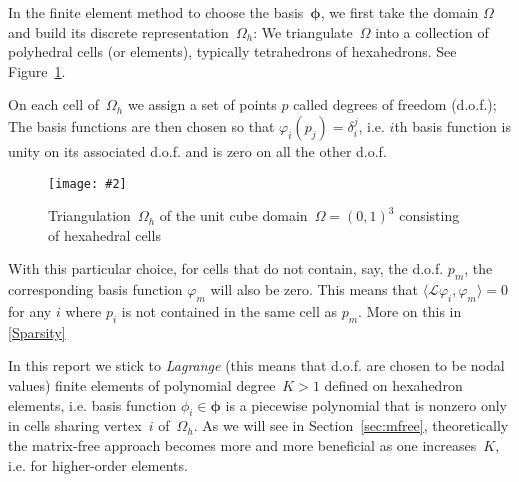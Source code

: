 \documentclass[12pt]{article}
\newcommand{\includegraphicsw}[2][1.]{\texttt{[image: \#2]}}
\newcommand{\vect}[1]{\boldsymbol{\mathbf{#1}}}
\newcommand{\AZ}[1]{{\color{red}\textbf{AZ}:~#1}}
\begin{document}
In the finite element method to choose the basis~$\vect\phi$, we first take the domain $\Omega$ and build its discrete representation~$\Omega_h$: We triangulate~$\Omega$ into a collection of polyhedral cells (or elements), typically tetrahedrons of hexahedrons. See Figure~\ref{fig:mesh}.

%

On each cell of~$\Omega_h$ we assign a set of points $p$ called degrees of freedom (d.o.f.); The basis functions are then chosen so that $\varphi_{i}(p_{j}) = \delta_{i}^{j}$, i.e. $i$th basis function is unity on its associated d.o.f. and is zero on all the other d.o.f. %

\begin{figure}[H]
	\centering
	\includegraphicsw[.4]{mesh.png}
	\caption{Triangulation~$\Omega_h$ of the unit cube domain~$\Omega = (0, 1)^{3}$ consisting of hexahedral cells}\label{fig:mesh}
\end{figure}

With this particular choice, for cells that do not contain, say, the d.o.f. $p_{m}$, the corresponding basis function $\varphi_{m}$ will also be zero. This means that $\langle \mathcal{L}\varphi_{i}, \varphi_{m}\rangle = 0$ for any $i$ where $p_{i}$ is not contained in the same cell as $p_{m}$. More on this in \ref{Sparsity}

In this report we stick to \textit{Lagrange} (this means that d.o.f. are chosen to be nodal values) finite elements of polynomial degree~$K > 1$ defined on hexahedron elements, i.e. basis function $\phi_i \in \vect\phi$ is a piecewise polynomial that is nonzero only in cells sharing vertex~$i$ of~$\Omega_h$. As we will see in Section~\ref{sec:mfree}, theoretically the matrix-free approach becomes more and more beneficial as one increases~$K$, i.e. for higher-order elements. 
\end{document}
